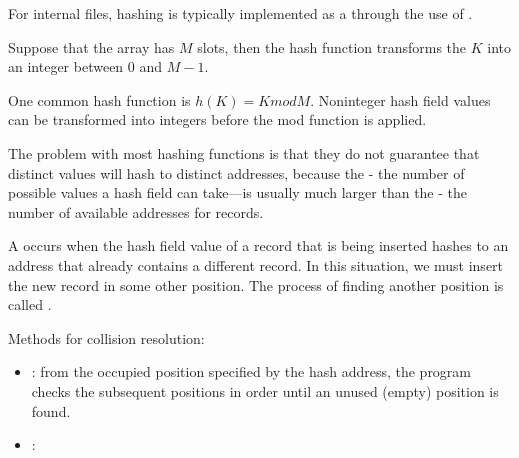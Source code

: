       \par For internal files, hashing is typically implemented as a  through the use of .
      \par Suppose that the array has $M$ slots, then the hash function transforms the  $K$ into an integer between $0$ and $M - 1$.
      \par One common hash function is $h(K) = K mod M$. Noninteger hash field values can be transformed into integers before the mod function is applied.
      \par The problem with most hashing functions is that they do not guarantee that distinct values will hash to distinct addresses, because the  - the number of possible values a hash field can take—is usually much larger than the  - the number of available addresses for records.

      \par A  occurs when the hash field value of a record that is being inserted hashes to an address that already contains a different record. In this situation, we must insert the new record in some other position. The process of finding another position is called .
      \par Methods for collision resolution:
      \begin{itemize}
        \item {}: from the occupied position specified by the hash address, the program checks the subsequent positions in order until an unused (empty) position is found.
        \item {}: 
      \end{itemize}